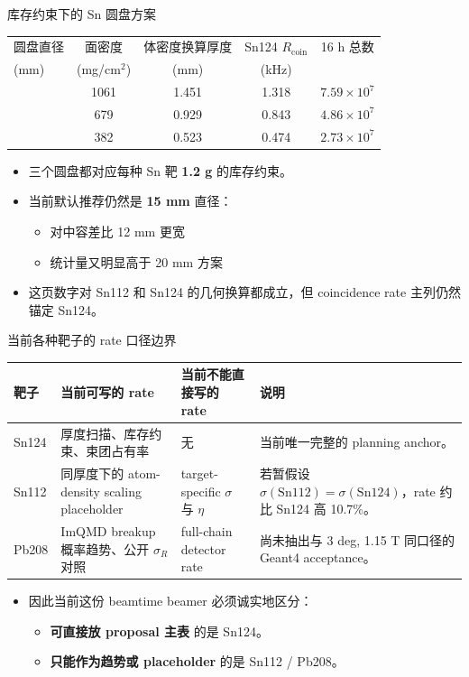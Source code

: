 \documentclass[aspectratio=169]{ctexbeamer}
\begin{document}
\begin{frame}{库存约束下的 Sn 圆盘方案}
\small
\centering
\begin{tabular}{>{\raggedright\arraybackslash}p{1.7cm}cccc}
\toprule
圆盘直径 & 面密度 & 体密度换算厚度 & Sn124 $R_{\mathrm{coin}}$ & 16 h 总数 \\
(mm) & (mg/cm$^2$) & (mm) & (kHz) &  \\
\midrule
12 & 1061 & 1.451 & 1.318 & $7.59\times 10^7$ \\
15 & 679 & 0.929 & 0.843 & $4.86\times 10^7$ \\
20 & 382 & 0.523 & 0.474 & $2.73\times 10^7$ \\
\bottomrule
\end{tabular}

\vspace{0.35cm}
\begin{itemize}
  \item 三个圆盘都对应每种 Sn 靶 \textbf{1.2 g} 的库存约束。
  \item 当前默认推荐仍然是 \textbf{15 mm} 直径：
  \begin{itemize}
    \item 对中容差比 12 mm 更宽
    \item 统计量又明显高于 20 mm 方案
  \end{itemize}
  \item 这页数字对 Sn112 和 Sn124 的几何换算都成立，但 coincidence rate 主列仍然锚定 Sn124。
\end{itemize}
\end{frame}

\begin{frame}{当前各种靶子的 rate 口径边界}
\small
\centering
\begin{tabular}{>{\raggedright\arraybackslash}p{1.5cm}p{2.3cm}p{2.3cm}p{4.6cm}}
\toprule
靶子 & 当前可写的 rate & 当前不能直接写的 rate & 说明 \\
\midrule
Sn124 & 厚度扫描、库存约束、束团占有率 & 无 & 当前唯一完整的 planning anchor。 \\
Sn112 & 同厚度下的 atom-density scaling placeholder & target-specific $\sigma$ 与 $\eta$ & 若暂假设 $\sigma(\mathrm{Sn112})=\sigma(\mathrm{Sn124})$，rate 约比 Sn124 高 10.7\%。 \\
Pb208 & ImQMD breakup 概率趋势、公开 $\sigma_R$ 对照 & full-chain detector rate & 尚未抽出与 3 deg, 1.15 T 同口径的 Geant4 acceptance。 \\
\bottomrule
\end{tabular}

\vspace{0.3cm}
\begin{itemize}
  \item 因此当前这份 beamtime beamer 必须诚实地区分：
  \begin{itemize}
    \item \textbf{可直接放 proposal 主表} 的是 Sn124。
    \item \textbf{只能作为趋势或 placeholder} 的是 Sn112 / Pb208。
  \end{itemize}
\end{itemize}
\end{frame}
\end{document}
